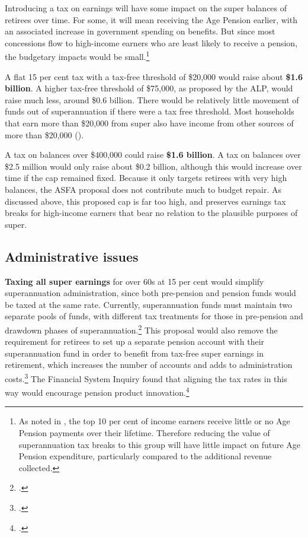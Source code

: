 \documentclass{grattanAlpha}
\begin{document}
Introducing a tax on earnings will have some impact on the super balances of retirees over time. For some, it will mean receiving the Age Pension earlier, with an associated increase in government spending on benefits. But since most concessions flow to high-income earners who are least likely to receive a pension, the budgetary impacts would be small.\footnote{As noted in , the top 10 per cent of income earners receive little or no Age Pension payments over their lifetime. Therefore reducing the value of superannuation tax breaks to this group will have little impact on future Age Pension expenditure, particularly compared to the additional revenue collected.} 

A flat 15 per cent tax with a tax-free threshold of \$20,000 would raise about \textbf{\$1.6 billion}. A higher tax-free threshold of \$75,000, as proposed by the ALP, would raise much less, around \$0.6 billion. There would be relatively little movement of funds out of superannuation if there were a tax free threshold. Most households that earn more than \$20,000 from super also have income from other sources of more than \$20,000 ().

A tax on balances over \$400,000 could raise \textbf{\$1.6 billion}.  A tax on balances over \$2.5 million would only raise about \$0.2 billion, although this would increase over time if the cap remained fixed. Because it only targets retirees with very high balances, the ASFA proposal does not contribute much to budget repair. As discussed above, this proposed cap is far too high, and preserves earnings tax breaks for high-income earners that bear no relation to the plausible purposes of super.

\subsection{Administrative issues}
\textbf{Taxing all super earnings} for over 60s at 15 per cent would simplify superannuation administration, since both pre-pension and pension funds would be taxed at the same rate. Currently, superannuation funds must maintain two separate pools of funds, with different tax treatments for those in pre-pension and drawdown phases of superannuation.\footcite[][44]{FinancialSystemsInquiry2015}  This proposal would also remove the requirement for retirees to set up a separate pension account with their superannuation fund in order to benefit from tax-free super earnings in retirement, which increases the number of accounts and adds to administration costs.\footcite{RiceWarner2015SubmissionTaxWhitePaper}  The Financial System Inquiry found that aligning the tax rates in this way would encourage pension product innovation.\footcite[][139]{FinancialSystemsInquiry2015} 
\end{document}
